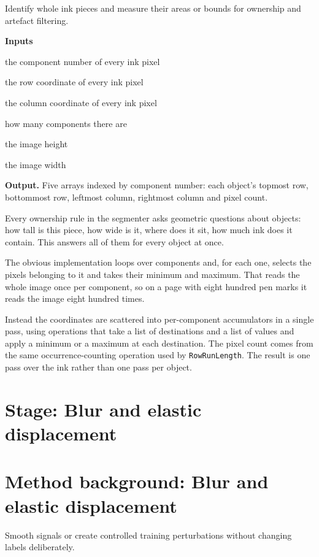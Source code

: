 Identify whole ink pieces and measure their areas or bounds for ownership and artefact filtering.




\noindent\textbf{Inputs}
\begin{description}[leftmargin=2.2em,style=nextline,font=\normalfont\ttfamily]\setlength\itemsep{1pt}
  \item[{pl}] \normalfont the component number of every ink pixel
  \item[{ys}] \normalfont the row coordinate of every ink pixel
  \item[{xs}] \normalfont the column coordinate of every ink pixel
  \item[{nc}] \normalfont how many components there are
  \item[{H}] \normalfont the image height
  \item[{W}] \normalfont the image width
\end{description}

\noindent\textbf{Output.} Five arrays indexed by component number: each object's topmost row, bottommost row, leftmost column, rightmost column and pixel count.


Every ownership rule in the segmenter asks geometric questions about objects: how tall is this piece, how wide is it, where does it sit, how much ink does it contain. This answers all of them for every object at once.


The obvious implementation loops over components and, for each one, selects the pixels belonging to it and takes their minimum and maximum. That reads the whole image once per component, so on a page with eight hundred pen marks it reads the image eight hundred times.

Instead the coordinates are scattered into per-component accumulators in a single pass, using operations that take a list of destinations and a list of values and apply a minimum or a maximum at each destination. The pixel count comes from the same occurrence-counting operation used by \texttt{RowRunLength}. The result is one pass over the ink rather than one pass per object.



\section*{Stage: Blur and elastic displacement}
\section{Method background: Blur and elastic displacement}\label{method:filter}
Smooth signals or create controlled training perturbations without changing labels deliberately.


